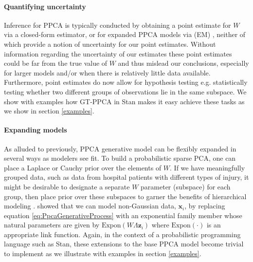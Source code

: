 \documentclass{article}
\newcommand{\mb}[1]{\mathbf{#1}}
\begin{document}
\paragraph{Quantifying uncertainty}
Inference for PPCA is typically conducted by obtaining a point estimate for $W$ via a closed-form estimator, or for expanded PPCA models via (EM) \citep[chapt.~12.2]{murphy2012machine}, neither of which provide a notion of uncertainty for our point estimates. Without information regarding the uncertainty of our estimates these point estimates could be far from the true value of $W$ and thus mislead our conclusions, especially for larger models and/or when there is relatively little data available. Furthermore, point estimates do now allow for hypothesis testing e.g. statistically testing whether two different groups of observations lie in the same subspace. We show with examples how GT-PPCA in Stan makes it easy achieve these tasks as we show in section \ref{examples}.

\paragraph{Expanding models}
As alluded to previously, PPCA generative model can be flexibly expanded in several ways as modelers see fit. To build a probabilistic sparse PCA, one can place a Laplace or Cauchy prior over the elements of $W$. If we have meaningfully grouped data, such as data from hospital patients with different types of injury, it might be desirable to designate a separate $W$ parameter (subspace) for each group, then place prior over these subspaces to garner the benefits of hierarchical modeling \citep[chapt.~5]{gelman2014bayesian}. \citet{mohamed2009bayesian} showed that we can model non-Gaussian data, $\mb{x}_i$, by replacing equation \ref{eq:PpcaGenerativeProcess} with an exponential family member whose natural parameters are given by $\mathrm{Expon}(W\Lambda \mb{z}_i)$ where $\mathrm{Expon}(\cdot)$ is an appropriate link function.  Again, in the context of a probabilistic programming language such as Stan, these extensions to the base PPCA model become trivial to implement as we illustrate with examples in section \ref{examples}.
\end{document}
